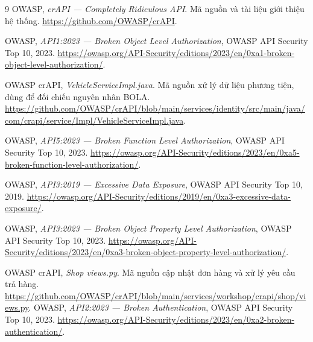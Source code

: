 \documentclass[oneside,a4paper,12pt]{extreport}
\begin{document}
\clearpage
\begin{thebibliography}{9}
    OWASP, \textit{crAPI --- Completely Ridiculous API}.
    Mã nguồn và tài liệu giới thiệu hệ thống.
    \url{https://github.com/OWASP/crAPI}.

    OWASP, \textit{API1:2023 --- Broken Object Level Authorization},
    OWASP API Security Top 10, 2023.
    \url{https://owasp.org/API-Security/editions/2023/en/0xa1-broken-object-level-authorization/}.

    OWASP crAPI, \textit{VehicleServiceImpl.java}.
    Mã nguồn xử lý dữ liệu phương tiện, dùng để đối chiếu nguyên nhân BOLA.
    \url{https://github.com/OWASP/crAPI/blob/main/services/identity/src/main/java/com/crapi/service/Impl/VehicleServiceImpl.java}.

    OWASP, \textit{API5:2023 --- Broken Function Level Authorization},
    OWASP API Security Top 10, 2023.
    \url{https://owasp.org/API-Security/editions/2023/en/0xa5-broken-function-level-authorization/}.

    OWASP, \textit{API3:2019 --- Excessive Data Exposure},
    OWASP API Security Top 10, 2019.
    \url{https://owasp.org/API-Security/editions/2019/en/0xa3-excessive-data-exposure/}.

    OWASP, \textit{API3:2023 --- Broken Object Property Level Authorization},
    OWASP API Security Top 10, 2023.
    \url{https://owasp.org/API-Security/editions/2023/en/0xa3-broken-object-property-level-authorization/}.

    OWASP crAPI, \textit{Shop views.py}.
    Mã nguồn cập nhật đơn hàng và xử lý yêu cầu trả hàng.
    \url{https://github.com/OWASP/crAPI/blob/main/services/workshop/crapi/shop/views.py}.
    OWASP, \textit{API2:2023 --- Broken Authentication},
    OWASP API Security Top 10, 2023.
    \url{https://owasp.org/API-Security/editions/2023/en/0xa2-broken-authentication/}.
\end{thebibliography}
\end{document}
